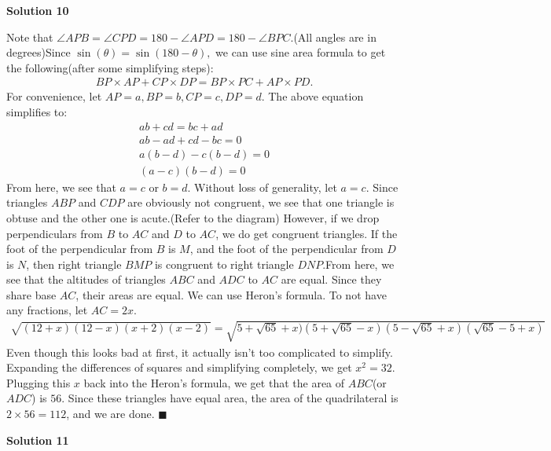 \begin{enumerate}
\textbf{Solution 10}

Note that $\angle APB = \angle CPD = 180-\angle APD = 180-\angle BPC.$(All angles are in degrees)Since $\sin(\theta)=\sin(180-\theta),$ we can use sine area formula to get the following(after some simplifying steps):
 \begin{align*} BP \times AP + CP \times DP = BP \times PC + AP \times PD. \end{align*}
For convenience, let $AP=a, BP=b, CP=c,DP=d.$ The above equation simplifies to:
 \begin{align*} ab + cd = bc + ad \\ab-ad+cd-bc=0 \\a(b-d)-c(b-d)=0 \\(a-c)(b-d)=0 \end{align*}
From here, we see that $a=c$ or $b=d$. Without loss of generality, let $a=c$. Since triangles $ABP$ and $CDP$ are obviously not congruent, we see that one triangle is obtuse and the other one is acute.(Refer to the diagram) However, if we drop perpendiculars from $B$ to $AC$ and $D$ to $AC$, we do get congruent triangles. If the foot of the perpendicular from $B$ is $M$, and the foot of the perpendicular from $D$ is $N$, then right triangle $BMP$ is congruent to right triangle $DNP$.From here, we see that the altitudes of triangles $ABC$ and $ADC$ to $AC$ are equal. Since they share base $AC$, their areas are equal. We can use Heron's formula. To not have any fractions, let $AC=2x.$
 \begin{align*} \sqrt{(12+x)(12-x)(x+2)(x-2)}=\sqrt{5+\sqrt{65}+x)(5+\sqrt{65}-x)(5-\sqrt{65}+x)(\sqrt{65}-5+x)} \end{align*}
Even though this looks bad at first, it actually isn't too complicated to simplify. Expanding the differences of squares and simplifying completely, we get $x^2=32.$ Plugging this $x$ back into the Heron's formula, we get that the area of $ABC$(or $ADC$) is $56$. Since these triangles have equal area, the area of the quadrilateral is $2 \times 56 = \boxed{112}$, and we are done. $\blacksquare$




\textbf{Solution 11}



\end{enumerate}
